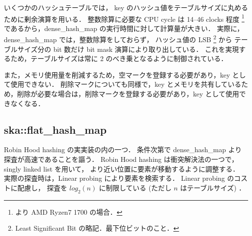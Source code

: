 いくつかのハッシュテーブルでは，
key のハッシュ値をテーブルサイズに丸めるために剰余演算を用いる．
整数除算に必要な CPU cycle は 14--46 clocks 程度
\footnote{
  \cite{AgnerFog2018}より AMD Ryzen7 1700 の場合．
}
であるから，dense\_hash\_map の実行時間に対して計算量が大きい．
実際に，
dense\_hash\_map では，整数除算をしておらず，
ハッシュ値の LSB \footnote{Least Significant Bit の略記．最下位ビットのこと．} から
テーブルサイズ分の bit 数だけ bit mask 演算により取り出している．
これを実現するため，テーブルサイズは常に 2 のべき乗となるように制御されている．

また，メモリ使用量を削減するため，空マークを登録する必要があり，key として使用できない．
削除マークについても同様で，key とメモリを共有しているため，削除が必要な場合は，削除マークを登録する必要があり，key として使用できなくなる．

\subsection{ska::flat\_hash\_map}

Robin Hood hashing の実実装の内の一つ．
条件次第で dense\_hash\_map より探査が高速であることを謳う．
Robin Hood hashing は衝突解決法の一つで，
singly linked list を用いて，
より近い位置に要素が移動するように調整する．
実際の探査時は，Linear probing により要素を検索する．
Linear probing のコストに配慮し，
探査を $log_2(n)$ に制限している (ただし $n$ はテーブルサイズ) \cite{Skarupke2017}．

